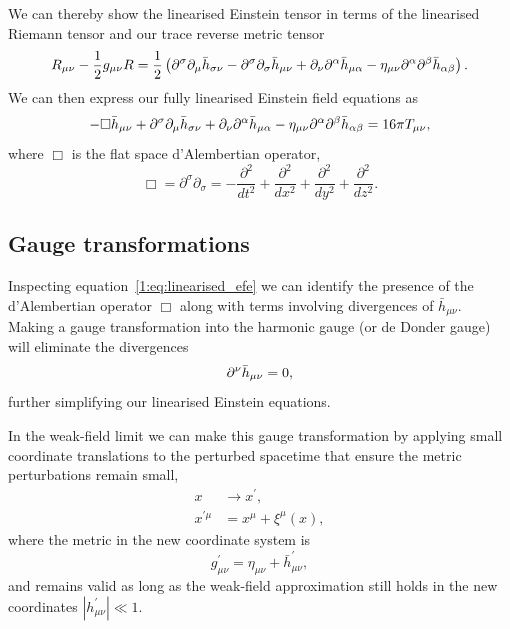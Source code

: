 We can thereby show the linearised Einstein tensor in terms of the linearised Riemann tensor and our trace reverse metric tensor
%
\begin{equation}
    R_{\mu\nu} - \frac{1}{2}g_{\mu\nu}R = \frac{1}{2}\left(\partial^{\sigma}\partial_{\mu}\Bar{h}_{\sigma\nu} - \partial^{\sigma}\partial_{\sigma}\Bar{h}_{\mu\nu} + \partial_{\nu}\partial^{\alpha}\Bar{h}_{\mu\alpha} - \eta_{\mu\nu}\partial^{\alpha}\partial^{\beta}\Bar{h}_{\alpha\beta}\right).
\end{equation}
%
We can then express our fully linearised Einstein field equations as
%
\begin{equation}
    - \Box\Bar{h}_{\mu\nu} + \partial^{\sigma}\partial_{\mu}\Bar{h}_{\sigma\nu}  + \partial_{\nu}\partial^{\alpha}\Bar{h}_{\mu\alpha} - \eta_{\mu\nu}\partial^{\alpha}\partial^{\beta}\Bar{h}_{\alpha\beta} = 16\pi T_{\mu\nu},
    \label{1:eq:linearised_efe}
\end{equation}
%
where $\Box$ is the flat space d'Alembertian operator,
%
\begin{equation}
    \Box = \partial^{\sigma}\partial_{\sigma} = -\frac{\partial^{2}}{dt^{2}} + \frac{\partial^{2}}{dx^{2}} + \frac{\partial^{2}}{dy^{2}} + \frac{\partial^{2}}{dz^{2}}.
\end{equation}
%

\subsection{\label{1:sec:gauge-transformations}Gauge transformations}

Inspecting equation~\ref{1:eq:linearised_efe} we can identify the presence of the d'Alembertian operator $\Box$ along with terms involving divergences of $\bar{h}_{\mu\nu}$. Making a gauge transformation into the 
harmonic gauge (or de Donder gauge) will eliminate the divergences
%
\begin{equation}
    \partial^{\nu} \Bar{h}_{\mu\nu} = 0,
    \label{1:eq:divergence_gone}
\end{equation}
%
further simplifying our linearised Einstein equations.

In the weak-field limit we can make this gauge transformation by applying small coordinate translations to the perturbed spacetime that ensure the metric perturbations remain small,
%
\begin{align}
    x &\rightarrow x^{\prime}, \\
    x^{\prime\mu} &= x^{\mu} + \xi^{\mu}(x),
    \label{1:eq:gauge_transform}
\end{align}
%
where the metric in the new coordinate system is
%
\begin{equation}
    g^{\prime}_{\mu\nu} = \eta_{\mu\nu} + \bar{h}^{\prime}_{\mu\nu},
    \label{1:eq:gauge_metric}
\end{equation}
%
and remains valid as long as the weak-field approximation still holds in the new coordinates $|h^{\prime}_{\mu\nu}| \ll 1$.

